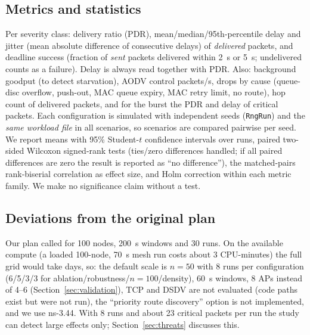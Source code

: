 \subsection{Metrics and statistics}
Per severity class: delivery ratio (PDR), mean/median/95th-percentile delay and jitter (mean absolute difference of consecutive delays) of \emph{delivered} packets,
and deadline success (fraction of \emph{sent} packets delivered within 2~s or 5~s; undelivered counts as a failure). Delay is always read together with PDR. Also: background
goodput (to detect starvation), AODV control packets/s, drops by cause (queue-disc overflow, push-out, MAC queue expiry, MAC retry limit,
no route), hop count of delivered packets, and for the burst the PDR and delay of critical packets.
Each configuration is simulated with independent seeds (\texttt{RngRun}) and the \emph{same workload file} in all scenarios, so scenarios are compared
pairwise per seed. We report means with 95\% Student-$t$ confidence intervals over runs, paired two-sided Wilcoxon signed-rank tests (ties/zero differences
handled; if all paired differences are zero the result is reported as ``no difference''), the matched-pairs rank-biserial correlation as effect size,
and Holm correction within each metric family. We make no significance claim without a test.

\subsection{Deviations from the original plan}
Our plan called for 100 nodes, 200~s windows and 30 runs. On the available compute (a loaded 100-node, 70~s mesh run costs about 3 CPU-minutes) the full
grid would take days, so: the default scale is $n=50$ with 8 runs per configuration (6/5/3/3 for ablation/robustness/$n{=}100$/density), 60~s windows, 8 APs instead of 4--6
(Section~\ref{sec:validation}), TCP and DSDV are not evaluated (code paths exist but were not run), the ``priority route discovery'' option is not implemented, and we use ns-3.44.
With 8 runs and about 23 critical packets per run the study can detect large effects only; Section~\ref{sec:threats} discusses this.

